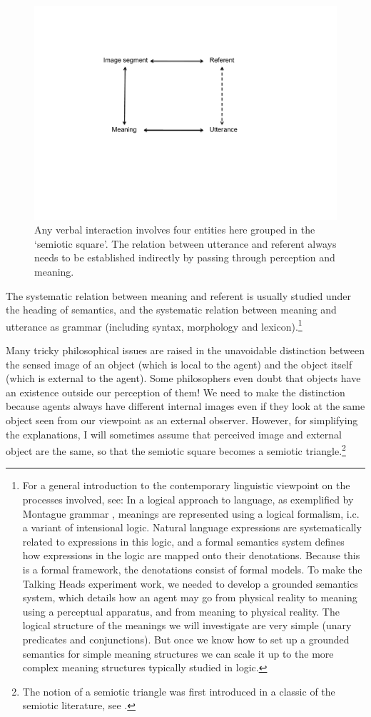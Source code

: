 \begin{figure}[htbp]
  \centerline{\includegraphics[width=.65\textwidth]{chap2/figs/triangle}}
\caption{\small\label{triangle} Any verbal interaction
involves four entities here grouped in the
`semiotic square'. The relation between utterance
and referent always needs to be established indirectly by 
passing through perception and meaning.}
\end{figure}

The systematic relation between meaning and referent is 
usually studied under the heading of semantics, and the 
systematic relation between meaning and utterance as
grammar (including syntax, morphology and lexicon).\footnote{
For a general introduction to the contemporary linguistic
viewpoint on the processes involved, see: \cite{Vanvalin:1997} 
In a logical approach to language, as 
exemplified by Montague grammar \cite{Montague:1974},  
meanings are represented using a logical formalism, i.c.
a variant of intensional logic. 
Natural language expressions are systematically 
related to expressions in this logic, and a
formal semantics system defines how expressions in the logic
are mapped onto their denotations. Because this is 
a formal framework, the denotations consist of formal 
models. To make the Talking Heads experiment work, 
we needed to develop a grounded semantics system, which details
how an agent may go from physical reality to meaning
using a perceptual apparatus, and from meaning 
to physical reality. The logical structure of 
the meanings we will investigate are very simple 
(unary predicates and conjunctions). But once we know how to 
set up a grounded semantics for simple meaning
structures we can scale it up to the more complex meaning
structures typically studied in logic.}

Many tricky philosophical issues are raised in 
the unavoidable distinction between the sensed image
of an object (which is local to the agent)
and the object itself (which is external to the 
agent). Some philosophers even doubt that objects 
have an existence outside our perception of them! 
We need to make the distinction because agents always
have different internal images even if they look at 
the same object seen from our viewpoint as an external
observer. However, for simplifying the 
explanations, I will sometimes assume that perceived
image and external object are the same, so that the 
semiotic square becomes a semiotic triangle.\footnote{
The notion of a semiotic triangle was first
introduced in a classic of the semiotic literature, 
see \cite{Ogden:1935}.}

